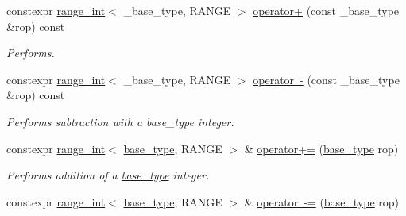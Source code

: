 \begin{DoxyCompactItemize}
\item 
\mbox{\label{classfsl_1_1lg_1_1range__int_ae36516b64216806a57986fcedaa07d63}} 
constexpr \mbox{\hyperlink{classfsl_1_1lg_1_1range__int}{range\+\_\+int}}$<$ \+\_\+base\+\_\+type, R\+A\+N\+GE $>$ \mbox{\hyperlink{classfsl_1_1lg_1_1range__int_ae36516b64216806a57986fcedaa07d63}{operator+}} (const \+\_\+base\+\_\+type \&rop) const
\begin{DoxyCompactList}\small\item\em Performs. \end{DoxyCompactList}\item 
\mbox{\label{classfsl_1_1lg_1_1range__int_a0cc2becff969f7e51756aa0b1ed478a6}} 
constexpr \mbox{\hyperlink{classfsl_1_1lg_1_1range__int}{range\+\_\+int}}$<$ \+\_\+base\+\_\+type, R\+A\+N\+GE $>$ \mbox{\hyperlink{classfsl_1_1lg_1_1range__int_a0cc2becff969f7e51756aa0b1ed478a6}{operator -\/}} (const \+\_\+base\+\_\+type \&rop) const
\begin{DoxyCompactList}\small\item\em Performs subtraction with a base\+\_\+type integer. \end{DoxyCompactList}\item 
\mbox{\label{classfsl_1_1lg_1_1range__int_ac16244bf164bdfb057a40d8a99216471}} 
constexpr \mbox{\hyperlink{classfsl_1_1lg_1_1range__int}{range\+\_\+int}}$<$ \mbox{\hyperlink{classfsl_1_1lg_1_1range__int_a901feb77897b3353d554f06d4d6a8f4a}{base\+\_\+type}}, R\+A\+N\+GE $>$ \& \mbox{\hyperlink{classfsl_1_1lg_1_1range__int_ac16244bf164bdfb057a40d8a99216471}{operator+=}} (\mbox{\hyperlink{classfsl_1_1lg_1_1range__int_a901feb77897b3353d554f06d4d6a8f4a}{base\+\_\+type}} rop)
\begin{DoxyCompactList}\small\item\em Performs addition of a \mbox{\hyperlink{classfsl_1_1lg_1_1range__int_a901feb77897b3353d554f06d4d6a8f4a}{base\+\_\+type}} integer. \end{DoxyCompactList}\item 
\mbox{\label{classfsl_1_1lg_1_1range__int_a09ff003e409df860716d0b4047333bc1}} 
constexpr \mbox{\hyperlink{classfsl_1_1lg_1_1range__int}{range\+\_\+int}}$<$ \mbox{\hyperlink{classfsl_1_1lg_1_1range__int_a901feb77897b3353d554f06d4d6a8f4a}{base\+\_\+type}}, R\+A\+N\+GE $>$ \& \mbox{\hyperlink{classfsl_1_1lg_1_1range__int_a09ff003e409df860716d0b4047333bc1}{operator -\/=}} (\mbox{\hyperlink{classfsl_1_1lg_1_1range__int_a901feb77897b3353d554f06d4d6a8f4a}{base\+\_\+type}} rop)

\end{DoxyCompactItemize}
